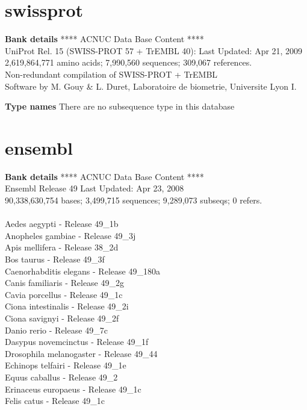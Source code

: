 \documentclass{article}
\begin{document}
\begin{Schunk}
\section{ swissprot }
\textbf{Bank details}
               ****     ACNUC Data Base Content      ****                       \\
    UniProt Rel. 15 (SWISS-PROT 57 + TrEMBL 40): Last Updated: Apr 21, 2009\\
          2,619,864,771 amino acids; 7,990,560 sequences; 309,067 references.\\
          Non-redundant compilation of SWISS-PROT + TrEMBL\\
Software by M. Gouy \& L. Duret, Laboratoire de biometrie, Universite Lyon I.

\textbf{Type names}
There are no subsequence type in this database
\section{ ensembl }
\textbf{Bank details}
             ****     ACNUC Data Base Content      ****\\
             Ensembl Release 49	     		 Last Updated: Apr 23, 2008\\
90,338,630,754 bases; 3,499,715 sequences; 9,289,073 subseqs; 0 refers.\\
\\
 Aedes aegypti - Release 49\_1b \\
 Anopheles gambiae - Release 49\_3j \\
 Apis mellifera - Release 38\_2d \\
 Bos taurus - Release 49\_3f \\
 Caenorhabditis elegans - Release 49\_180a \\
 Canis familiaris - Release 49\_2g \\
 Cavia porcellus - Release 49\_1c \\
 Ciona intestinalis - Release 49\_2i \\
 Ciona savignyi - Release 49\_2f \\
 Danio rerio - Release 49\_7c \\
 Dasypus novemcinctus - Release 49\_1f \\
 Drosophila melanogaster - Release 49\_44 \\
 Echinops telfairi - Release 49\_1e \\
 Equus caballus - Release 49\_2 \\
 Erinaceus europaeus - Release 49\_1c \\
 Felis catus - Release 49\_1c \\

\end{Schunk}
\end{document}
